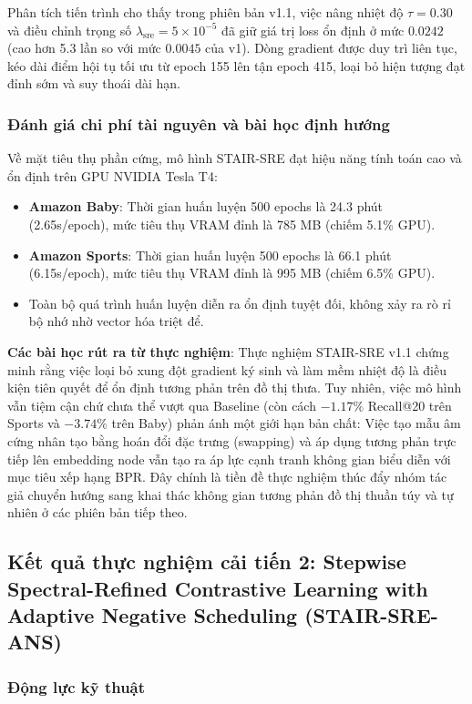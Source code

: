 Phân tích tiến trình cho thấy trong phiên bản v1.1, việc nâng nhiệt độ $\tau = 0.30$ và điều chỉnh trọng số $\lambda_{\text{sre}} = 5 \times 10^{-5}$ đã giữ giá trị loss ổn định ở mức $0.0242$ (cao hơn 5.3 lần so với mức $0.0045$ của v1). Dòng gradient được duy trì liên tục, kéo dài điểm hội tụ tối ưu từ epoch 155 lên tận epoch 415, loại bỏ hiện tượng đạt đỉnh sớm và suy thoái dài hạn.

\subsubsection{Đánh giá chi phí tài nguyên và bài học định hướng}
Về mặt tiêu thụ phần cứng, mô hình STAIR-SRE đạt hiệu năng tính toán cao và ổn định trên GPU NVIDIA Tesla T4:
\begin{itemize}[leftmargin=*]
    \item \textbf{Amazon Baby}: Thời gian huấn luyện 500 epochs là 24.3 phút (2.65s/epoch), mức tiêu thụ VRAM đỉnh là 785 MB (chiếm 5.1\% GPU).
    \item \textbf{Amazon Sports}: Thời gian huấn luyện 500 epochs là 66.1 phút (6.15s/epoch), mức tiêu thụ VRAM đỉnh là 995 MB (chiếm 6.5\% GPU).
    \item Toàn bộ quá trình huấn luyện diễn ra ổn định tuyệt đối, không xảy ra rò rỉ bộ nhớ nhờ vector hóa triệt để.
\end{itemize}
\noindent\textbf{Các bài học rút ra từ thực nghiệm}: Thực nghiệm STAIR-SRE v1.1 chứng minh rằng việc loại bỏ xung đột gradient ký sinh và làm mềm nhiệt độ là điều kiện tiên quyết để ổn định tương phản trên đồ thị thưa. Tuy nhiên, việc mô hình vẫn tiệm cận chứ chưa thể vượt qua Baseline (còn cách $-1.17\%$ Recall@20 trên Sports và $-3.74\%$ trên Baby) phản ánh một giới hạn bản chất: Việc tạo mẫu âm cứng nhân tạo bằng hoán đổi đặc trưng (swapping) và áp dụng tương phản trực tiếp lên embedding node vẫn tạo ra áp lực cạnh tranh không gian biểu diễn với mục tiêu xếp hạng BPR. Đây chính là tiền đề thực nghiệm thúc đẩy nhóm tác giả chuyển hướng sang khai thác không gian tương phản đồ thị thuần túy và tự nhiên ở các phiên bản tiếp theo.

\subsection{Kết quả thực nghiệm cải tiến 2: Stepwise Spectral-Refined Contrastive Learning with Adaptive Negative Scheduling (STAIR-SRE-ANS)}
\label{sec:stair_sre_ans}

\subsubsection{Động lực kỹ thuật}

